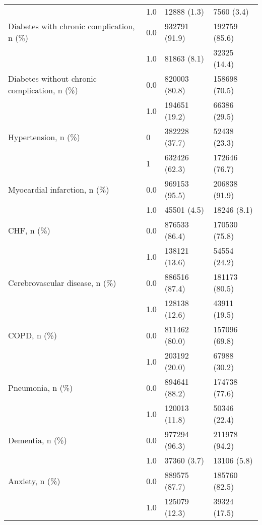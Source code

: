 \begin{tabular}{llll}
                                       & 1.0 &              12888 (1.3) &        7560 (3.4) \\
Diabetes with chronic complication, n (\%) & 0.0 &            932791 (91.9) &     192759 (85.6) \\
                                       & 1.0 &              81863 (8.1) &      32325 (14.4) \\
Diabetes without chronic complication, n (\%) & 0.0 &            820003 (80.8) &     158698 (70.5) \\
                                       & 1.0 &            194651 (19.2) &      66386 (29.5) \\
Hypertension, n (\%) & 0 &            382228 (37.7) &      52438 (23.3) \\
                                       & 1 &            632426 (62.3) &     172646 (76.7) \\
Myocardial infarction, n (\%) & 0.0 &            969153 (95.5) &     206838 (91.9) \\
                                       & 1.0 &              45501 (4.5) &       18246 (8.1) \\
CHF, n (\%) & 0.0 &            876533 (86.4) &     170530 (75.8) \\
                                       & 1.0 &            138121 (13.6) &      54554 (24.2) \\
Cerebrovascular disease, n (\%) & 0.0 &            886516 (87.4) &     181173 (80.5) \\
                                       & 1.0 &            128138 (12.6) &      43911 (19.5) \\
COPD, n (\%) & 0.0 &            811462 (80.0) &     157096 (69.8) \\
                                       & 1.0 &            203192 (20.0) &      67988 (30.2) \\
Pneumonia, n (\%) & 0.0 &            894641 (88.2) &     174738 (77.6) \\
                                       & 1.0 &            120013 (11.8) &      50346 (22.4) \\
Dementia, n (\%) & 0.0 &            977294 (96.3) &     211978 (94.2) \\
                                       & 1.0 &              37360 (3.7) &       13106 (5.8) \\
Anxiety, n (\%) & 0.0 &            889575 (87.7) &     185760 (82.5) \\
                                       & 1.0 &            125079 (12.3) &      39324 (17.5) \\

\end{tabular}
